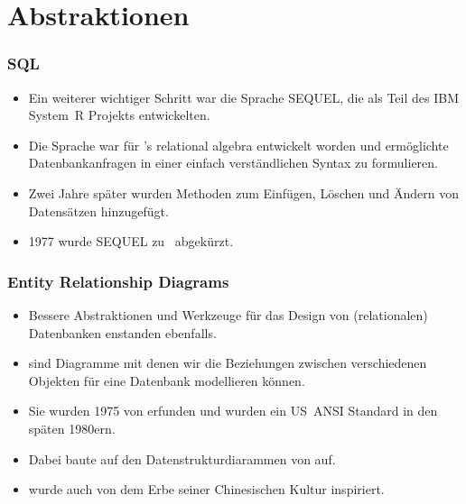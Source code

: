 \documentclass[aspectratio=169,mathserif,notheorems]{beamer}%
\begin{document}
\section{Abstraktionen}%
%
\begin{frame}[t]
\frametitle{SQL}%
\begin{itemize}%
\item Ein weiterer wichtiger Schritt war die Sprache SEQUEL, die \citeauthor{CB1974SASEQL} \citeyear{CB1974SASEQL} als Teil des IBM System~R Projekts entwickelten\cite{CB1974SASEQL}.%
\item<2-> Die Sprache war für \citeauthor{C1970ARMODFLSDB}'s relational algebra entwickelt worden und ermöglichte Datenbankanfragen in einer einfach verständlichen Syntax zu formulieren.%
\item<3-> Zwei Jahre später wurden Methoden zum Einfügen, Löschen und Ändern von Datensätzen hinzugefügt\cite{CAEGLMRB1976S2AUATDDMAC}.%
\item<4-> 1977 wurde SEQUEL zu \sql\ abgekürzt\cite{C20245YOQ}.%
\end{itemize}%
%
%
\end{frame}
%
\begin{frame}%
\frametitle{Entity Relationship Diagrams}%
\begin{itemize}%
\item Bessere Abstraktionen und Werkzeuge für das Design von (relationalen) Datenbanken enstanden ebenfalls.%
\item<2->  sind Diagramme mit denen wir die Beziehungen zwischen verschiedenen Objekten für eine Datenbank modellieren können\cite{KW2012ASHOTEDAIM,C1976TERMTAUVOD}.%
\item<3-> Sie wurden 1975 von \citeauthor{C1975TRMTAUVOD}\cite{C1975TRMTAUVOD} erfunden und wurden ein US~ANSI Standard in den späten 1980ern\cite{GK1985ATOOTIRDS,P1992IAX1ASFIRDSI}.%
\item<4-> Dabei baute \citeauthor{C1975TRMTAUVOD} auf den Datenstrukturdiarammen von \citeauthor{B1969DSD}\cite{B1969DSD} auf.%
\item<5->  wurde auch von dem Erbe seiner Chinesischen Kultur inspiriert\cite{C1997ECAED,C2002ERMHEFTALL}.%
\end{itemize}%
%
%
%
%
%
\end{frame}%
%
\end{document}

